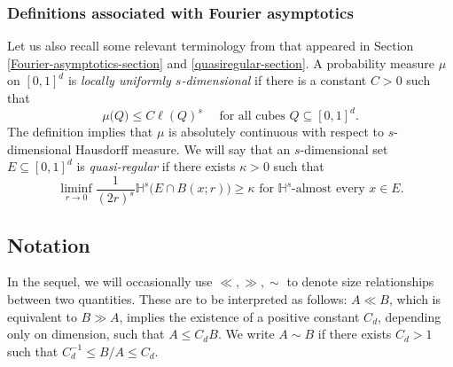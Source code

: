 \documentclass[a4paper,11pt]{amsart}
\numberwithin{equation}{section}
\begin{document}
\subsubsection{Definitions associated with Fourier asymptotics} \label{quasiregularity-section} Let us also recall some relevant terminology from \cite{Strichartz-Asymptotics} that appeared in Section \ref{Fourier-asymptotics-section} and \ref{quasiregular-section}. A probability measure $\mu$ on $[0,1]^d$ is {\em{locally uniformly $s$-dimensional}} if there is a constant $C > 0$ such that
\begin{equation} \label{loc-u-dim-def} \mu \bigl(Q\bigr) \leq C \ell(Q)^s \quad \text{ for all cubes } Q \subseteq [0,1]^d.  \end{equation}  
The definition implies that $\mu$ is absolutely continuous with respect to $s$-dimensional Hausdorff measure.  We will say that an $s$-dimensional set $E \subseteq [0,1]^d$ is {\em{quasi-regular}} if there exists $\kappa > 0$ such that
\begin{equation} 
\label{Quasiregular-def} 
\liminf_{r \rightarrow 0} \frac{1}{(2r)^s} \mathbb H^{s}\bigl(E\cap B(x;r)\bigr) \geq \kappa \text{ for $\mathbb H^s$-almost every $x \in E$}. 
\end{equation}  
 \subsection{Notation}  
In the sequel, we will occasionally use $\ll, \gg, \sim$ to denote size relationships between two quantities. These are to be interpreted as follows: $A \ll B$, which is equivalent to $B \gg A$, implies the existence of a positive constant $C_d$, depending only on dimension, such that $A \leq C_d B$. We write $A \sim B$ if there exists $C_d > 1$ such that $C_d^{-1} \leq B/A \leq C_d$. 
\end{document}
